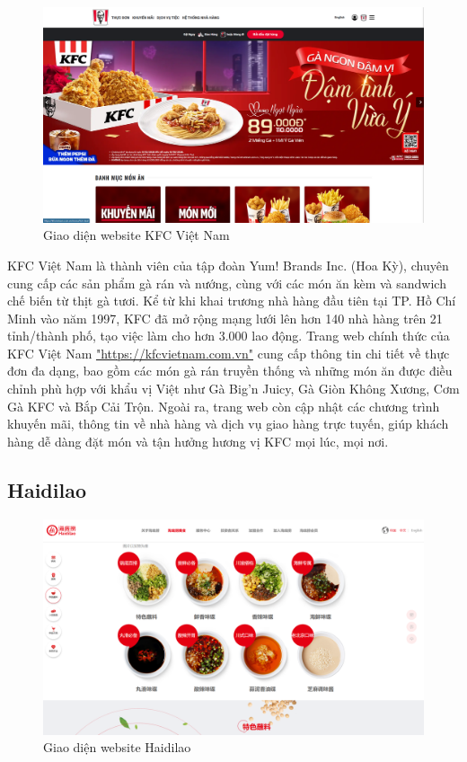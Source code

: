 \begin{figure}[H]
    \centering
    \includegraphics[width=15cm]{Images/kfc.png}
    \vspace{0.5cm}
    \caption{Giao diện website KFC Việt Nam}
    \label{fig:my_label}
\end{figure}

KFC Việt Nam là thành viên của tập đoàn Yum! Brands Inc. (Hoa Kỳ), chuyên cung cấp các sản phẩm gà rán và nướng, cùng với các món ăn kèm và sandwich chế biến từ thịt gà tươi. Kể từ khi khai trương nhà hàng đầu tiên tại TP. Hồ Chí Minh vào năm 1997, KFC đã mở rộng mạng lưới lên hơn 140 nhà hàng trên 21 tỉnh/thành phố, tạo việc làm cho hơn 3.000 lao động. Trang web chính thức của KFC Việt Nam \href{https://kfcvietnam.com.vn}{"https://kfcvietnam.com.vn"} cung cấp thông tin chi tiết về thực đơn đa dạng, bao gồm các món gà rán truyền thống và những món ăn được điều chỉnh phù hợp với khẩu vị Việt như Gà Big'n Juicy, Gà Giòn Không Xương, Cơm Gà KFC và Bắp Cải Trộn. Ngoài ra, trang web còn cập nhật các chương trình khuyến mãi, thông tin về nhà hàng và dịch vụ giao hàng trực tuyến, giúp khách hàng dễ dàng đặt món và tận hưởng hương vị KFC mọi lúc, mọi nơi.

\subsection{Haidilao}

\begin{figure}[H]
    \centering
    \includegraphics[width=15cm]{Images/haidilao.png}
    \vspace{0.5cm}
    \caption{Giao diện website Haidilao}
    \label{fig:my_label}
\end{figure}

